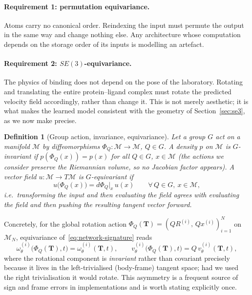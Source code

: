 \documentclass[a4paper,12pt]{article}
\newtheorem{definition}[theorem]{Definition}
\theoremstyle{remark}
\begin{document}
\paragraph{Requirement 1: permutation equivariance.}
Atoms carry no canonical order. Reindexing the input must permute the output in the same
way and change nothing else. Any architecture whose computation depends on the storage
order of its inputs is modelling an artefact.

\paragraph{Requirement 2: $SE(3)$-equivariance.}
The physics of binding does not depend on the pose of the laboratory. Rotating and
translating the entire protein--ligand complex must rotate the predicted velocity field
accordingly, rather than change it. This is not merely aesthetic; it is what makes the
learned model consistent with the geometry of Section~\ref{sec:se3}, as we now make
precise.

\begin{definition}[Group action, invariance, equivariance]
\label{def:equivariance}
Let a group $G$ act on a manifold $\mathcal M$ by diffeomorphisms $\Phi_Q:\mathcal M\to\mathcal M$,
$Q\in G$. A density $p$ on $\mathcal M$ is \emph{$G$-invariant} if $p(\Phi_Q(x))=p(x)$ for all
$Q\in G$, $x\in\mathcal M$ (the actions we consider preserve the Riemannian volume, so no
Jacobian factor appears). A vector field $u:\mathcal M\to T\mathcal M$ is \emph{$G$-equivariant} if
\[
u\bigl(\Phi_Q(x)\bigr)
=
d\Phi_Q\bigl|_x\,u(x)
\qquad\forall\,Q\in G,\ x\in\mathcal M ,
\]
i.e.\ transforming the input and then evaluating the field agrees with evaluating the
field and then pushing the resulting tangent vector forward.
\end{definition}

Concretely, for the global rotation action $\Phi_Q(\mathbf T)=(QR^{(i)},\,Qx^{(i)})_{i=1}^N$
on $\mathcal M_N$, equivariance of~\eqref{eq:network-signature} reads
\begin{equation}
\label{eq:equivariance-concrete}
\omega^{(i)}_\theta\bigl(\Phi_Q(\mathbf T),t\bigr)=\omega^{(i)}_\theta(\mathbf T,t),
\qquad
v^{(i)}_\theta\bigl(\Phi_Q(\mathbf T),t\bigr)=Q\,v^{(i)}_\theta(\mathbf T,t),
\end{equation}
where the rotational component is \emph{invariant} rather than covariant precisely
because it lives in the left-trivialised (body-frame) tangent space; had we used the
right trivialisation it would rotate. This asymmetry is a frequent source of sign and
frame errors in implementations and is worth stating explicitly once.
\end{document}

